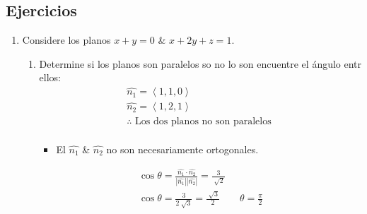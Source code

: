 \subsection{Ejercicios}
\begin{enumerate}
    \item Considere los planos $x+y=0$ \& $x+2y+z=1$.
        \begin{enumerate}
            \item Determine si los planos son paralelos so no lo son encuentre el ángulo entr ellos:
                \begin{align*}
                    \hat{n_1} = \left\langle 1,1,0 \right\rangle \\ 
                    \hat{n_2} = \left\langle 1,2,1 \right\rangle \\ 
                    \therefore \text{  Los dos planos no son paralelos  } \\ 
                \end{align*}
                \begin{itemize}
                    \item El $\hat{n_1}$ \& $\hat{n_2}$ no son necesariamente ortogonales.
                \end{itemize}
                \begin{align*}
                    \cos \theta = \frac{\hat{n_1}\cdot\hat{n_2}}{\left| \hat{n_1} \right|\left| \hat{n_2} \right| } = \frac{3}{\sqrt[]{2}} \\ 
                    \cos \theta = \frac{3}{2\sqrt[]{3}}=\frac{\sqrt[]{3}}{2} \qquad \theta = \frac{\pi}{2} \\   
                \end{align*}
        \end{enumerate}
    

\end{enumerate}
